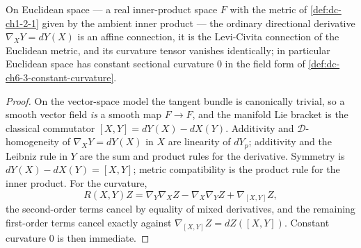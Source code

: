 \begin{lemma}
  \label{lem:dc-ch6-2-8-euclidean}


  On Euclidean space — a real inner-product space $F$ with the metric of
  \cref{def:dc-ch1-2-1} given by the ambient inner product — the ordinary
  directional derivative $\nabla_XY=dY(X)$ is an affine connection, it is the
  Levi-Civita connection of the Euclidean metric, and its curvature tensor
  vanishes identically; in particular Euclidean space has constant sectional
  curvature $0$ in the field form of \cref{def:dc-ch6-3-constant-curvature}.
\end{lemma}
\begin{proof}

  \sketch
  On the vector-space model the tangent bundle is canonically trivial, so a
  smooth vector field \emph{is} a smooth map $F\to F$, and the manifold Lie
  bracket is the classical commutator $[X,Y]=dY(X)-dX(Y)$. Additivity and
  $\mathcal{D}$-homogeneity of $\nabla_XY=dY(X)$ in $X$ are linearity of
  $dY_p$; additivity and the Leibniz rule in $Y$ are the sum and product rules
  for the derivative. Symmetry is $dY(X)-dX(Y)=[X,Y]$; metric compatibility is
  the product rule for the inner product. For the curvature,
  $$
  R(X,Y)Z=\nabla_Y\nabla_XZ-\nabla_X\nabla_YZ+\nabla_{[X,Y]}Z ,
  $$
  the second-order terms cancel by equality of mixed derivatives, and the remaining first-order terms cancel exactly against
  $\nabla_{[X,Y]}Z=dZ([X,Y])$. Constant curvature $0$ is then immediate.
\end{proof}


